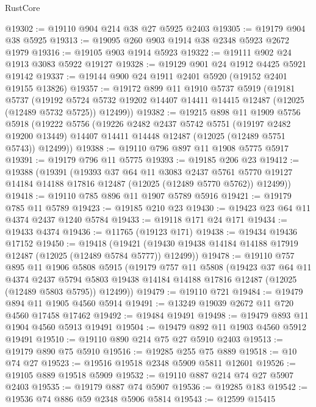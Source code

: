 \begin{lexlean}{RustCore}
\begin{coremodule}
@19302 := @19110 @904 @214 @38 @27 @5925 @2403
@19305 := @19179 @904 @38 @5925
@19313 := @19095 @260 @903 @1914 @38 @2348 @5923 @2672 @1979
@19316 := @19105 @903 @1914 @5923
@19322 := @19111 @902 @24 @1913 @3083 @5922 @19127
@19328 := @19129 @901 @24 @1912 @4425 @5921 @19142
@19337 := @19144 @900 @24 @1911 @2401 @5920 (@19152 @2401 @19155 @13826)
@19357 := @19172
    @899
    @11
    @1910
    @5737
    @5919
    (@19181
      @5737
      (@19192 @5724 @5732 @19202 @14407 @14411 @14415 @12487 (@12025 (@12489 @5732 @5725)) @12499))
@19382 := @19215
    @898
    @11
    @1909
    @5756
    @5918
    (@19222
      @5756
      (@19226
        @2482
        @2437
        @5742
        @5751
        (@19197 @2482 @19200 @13449)
        @14407
        @14411
        @14448
        @12487
        (@12025 (@12489 @5751 @5743))
        @12499))
@19388 := @19110 @796 @897 @11 @1908 @5775 @5917
@19391 := @19179 @796 @11 @5775
@19393 := @19185 @206 @23
@19412 := @19388
    (@19391
      (@19393
        @37
        @64
        @11
        @3083
        @2437
        @5761
        @5770
        @19127
        @14184
        @14188
        @17816
        @12487
        (@12025 (@12489 @5770 @5762))
        @12499))
@19418 := @19110 @785 @896 @11 @1907 @5789 @5916
@19421 := @19179 @785 @11 @5789
@19423 := @19185 @210 @23
@19430 := @19423 @23 @64 @11 @4374 @2437 @1240 @5784
@19433 := @19118 @171 @24 @171
@19434 := @19433 @4374
@19436 := @11765 (@19123 @171)
@19438 := @19434 @19436 @17152
@19450 := @19418
    (@19421 (@19430 @19438 @14184 @14188 @17919 @12487 (@12025 (@12489 @5784 @5777)) @12499))
@19478 := @19110
    @757
    @895
    @11
    @1906
    @5808
    @5915
    (@19179
      @757
      @11
      @5808
      (@19423
        @37
        @64
        @11
        @4374
        @2437
        @5794
        @5803
        @19438
        @14184
        @14188
        @17816
        @12487
        (@12025 (@12489 @5803 @5795))
        @12499))
@19479 := @19110 @721
@19484 := @19479 @894 @11 @1905 @4560 @5914
@19491 := @13249 @19039 @2672 @11 @720 @4560 @17458 @17462
@19492 := @19484 @19491
@19498 := @19479 @893 @11 @1904 @4560 @5913 @19491
@19504 := @19479 @892 @11 @1903 @4560 @5912 @19491
@19510 := @19110 @890 @214 @75 @27 @5910 @2403
@19513 := @19179 @890 @75 @5910
@19516 := @19285 @255 @75 @889
@19518 := @10 @74 @27
@19523 := @19516 @19518 @2348 @5909 @5811 @12601
@19526 := @19105 @889 @19518 @5909
@19532 := @19110 @887 @214 @74 @27 @5907 @2403
@19535 := @19179 @887 @74 @5907
@19536 := @19285 @183
@19542 := @19536 @74 @886 @59 @2348 @5906 @5814
@19543 := @12599 @15415

\end{coremodule}
\end{lexlean}
